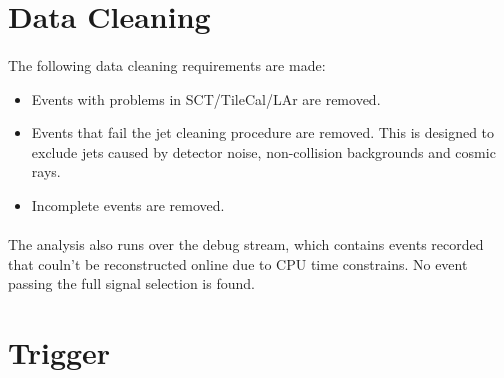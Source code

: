 \section{Data Cleaning}
\label{evt-sel:cleaning}
\paragraph{}
The following data cleaning requirements are made:
\begin{itemize}
\item Events with problems in SCT/TileCal/LAr are removed.
\item Events that fail the jet cleaning procedure are removed. This is designed to exclude jets caused by detector noise, non-collision backgrounds and cosmic rays. 
\item Incomplete events are removed.
\end{itemize}
\paragraph{}
The analysis also runs over the debug stream, which contains events recorded that couln't be reconstructed online due to CPU time constrains. No event passing the full signal selection is found.


\section{Trigger}
\label{evt-sel:trig}
